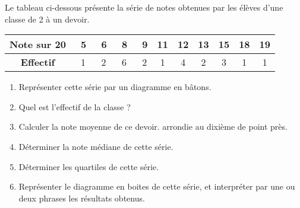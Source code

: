 
\begin{exercice}\label{exosmath-0147}

    Le tableau ci-dessous présente la série de notes obtenues par les
élèves d'une classe de 2  à un devoir.

\begin{center}
  \begin{tabular}{|c|*{10}{c|}}
    \hline
    \textbf{Note sur 20} & \ 5&\ 6&\ 8&\ 9&11&12&13&15&18&19 \\
    \hline
    \textbf{Effectif} & \ 1&\ 2&\ 6&\ 2&1&4&2&3&1&1 \\
    \hline
  \end{tabular}
\end{center}
\medskip

\begin{enumerate}
\item Représenter cette série par un diagramme en bâtons.
\item Quel est l'effectif de la classe ?
\item Calculer la note moyenne de ce devoir. 
  arrondie au dixième de point près.
\item Déterminer la note médiane de cette série.
\item Déterminer les quartiles de cette série.
\item Représenter le diagramme en boites de cette série, et
  interpréter par une ou deux phrases les résultats obtenus.
\end{enumerate}



\end{exercice}
